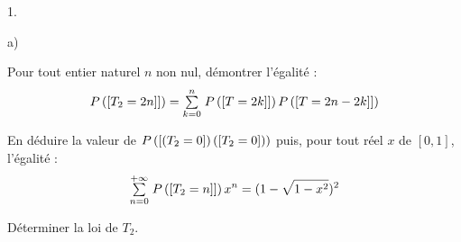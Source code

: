 \documentclass[11pt]{article}%
\begin{document}
\begin{noliste}{1.}
\item 

\begin{noliste}{a)}
 \setlength{\itemsep}{2mm}
\item Pour tout entier naturel $n$ non nul, démontrer l'égalité : 
\[
P\left(\left[ {T_{2} = 2n]} \right]\right) = {\textstyle\sum\limits_{k = 0}^{n}}\hspace{.1cm}P\left(\left[ {T =
2k]} \right]\right)P\left(\left[ {T = 2n-2k]} \right]\right)
\]

\item En déduire la valeur de $P\left(\left[ {(T_{2} =
0} \right]\right)\left(\left[ {T_{2} = 0} \right]\right))$ puis, pour tout réel $x$ de
$[0,1]$, l'égalité : 
\[
{\textstyle\sum\limits_{n = 0}^{+ \infty }}\hspace{.1cm}P\left(\left[ {T_{2} = n]} \right]\right)x^{n} =
(1-\sqrt{1-x^{2}})^{2}
\]
\end{noliste}

\item Déterminer la loi de $T_{2}$.
\end{noliste}

\label{fin}
\end{document}
